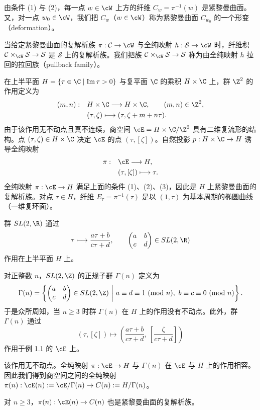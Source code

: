 由条件 (1) 与 (2)，每一点 $w\in\cW$ 上方的纤维 $C_w=\pi^{-1}(w)$ 是紧黎曼曲面。又，对一点 $w_0\in\cW$，我们把 $C_w$（$w\in\cW$）称为紧黎曼曲面 $C_{w_0}$ 的一个形变（deformation）。

当给定紧黎曼曲面的复解析族 $\pi:\mathcal{C}\to\cW$ 与全纯映射 $h:\mathcal{S}\to\cW$ 时，纤维积 $\mathcal{C}\times_\cW\mathcal{S}\to\mathcal{S}$ 是 $\mathcal{S}$ 上的复解析族。我们把族 $\mathcal{C}\times_\cW\mathcal{S}\to\mathcal{S}$ 称为由全纯映射 $h$ 拉回的拉回族（pullback family）。


\begin{example}[1.1]
在上半平面 $H=\{\tau\in\C\mid \operatorname{Im}\tau>0\}$ 与复平面 $\C$ 的乘积 $H\times\C$ 上，群 $\Z^2$ 的作用定义为
\[
\begin{aligned}
(m,n):\quad & H\times\C \longrightarrow H\times\C,\qquad (m,n)\in\Z^2,\\
& (\tau,\zeta)\longmapsto (\tau,\zeta+m+n\tau).
\end{aligned}
\]
由于该作用无不动点且真不连续，商空间 $\cE=H\times\C/\Z^2$ 具有二维复流形的结构。点 $(\tau,\zeta)\in H\times\C$ 决定 $\cE$ 的点 $(\tau,[\zeta])$。自然投影 $p:H\times\C\to H$ 诱导全纯映射
\[
\begin{aligned}
\pi:\quad & \cE \longrightarrow H,\\
& (\tau,[\zeta])\longmapsto \tau .
\end{aligned}
\]
全纯映射 $\pi:\cE\to H$ 满足上面的条件 (1)、(2)、(3)，因此是 $H$ 上紧黎曼曲面的复解析族。对点 $\tau\in H$，纤维 $E_\tau=\pi^{-1}(\tau)$ 是以 $(1,\tau)$ 为基本周期的椭圆曲线（一维复环面）。
\end{example}

\begin{example}[1.2]
群 $SL(2,\R)$ 通过
\[
\tau\longmapsto \frac{a\tau+b}{c\tau+d},\qquad \begin{pmatrix} a & b\\ c & d\end{pmatrix}\in SL(2,\R)
\]
作用在上半平面 $H$ 上。

对正整数 $n$，$SL(2,\Z)$ 的正规子群 $\Gamma(n)$ 定义为
\[
\Gamma(n)=\left\{\begin{pmatrix} a & b\\ c & d\end{pmatrix}\in SL(2,\Z)\ \middle|\
a\equiv d\equiv 1\ (\mathrm{mod}\ n),\ b\equiv c\equiv 0\ (\mathrm{mod}\ n)\right\}.
\]
于是众所周知，当 $n\ge 3$ 时群 $\Gamma(n)$ 在 $H$ 上的作用没有不动点。此外，群 $\Gamma(n)$ 通过
\[
(\tau,[\zeta])\longmapsto \left(\frac{a\tau+b}{c\tau+d},\ \left[\frac{\zeta}{c\tau+d}\right]\right)
\]
作用于例 1.1 的 $\cE$ 上。

该作用无不动点。全纯映射 $\pi:\cE\to H$ 与 $\Gamma(n)$ 在 $\cE$ 与 $H$ 上的作用相容。因此我们得到商空间之间的全纯映射 $\pi(n):\cE(n):=\cE/\Gamma(n)\to C(n):=H/\Gamma(n)$。

对 $n\ge3$，$\pi(n):\cE(n)\to C(n)$ 也是紧黎曼曲面的复解析族。
\end{example}

